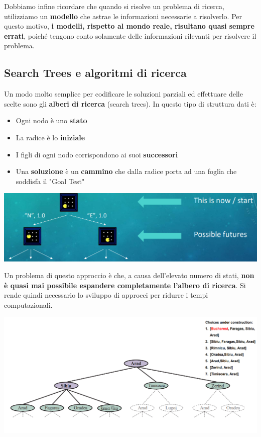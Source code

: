 \documentclass[12pt]{article}
\begin{document}
Dobbiamo infine ricordare che quando si risolve un problema di ricerca, utilizziamo un \textbf{modello} che astrae le informazioni necessarie a risolverlo.
Per questo motivo, \textbf{i modelli, rispetto al mondo reale, risultano quasi sempre errati}, poiché tengono conto solamente delle informazioni rilevanti per risolvere il problema.
\subsection{Search Trees e algoritmi di ricerca}
Un modo molto semplice per codificare le soluzioni parziali ed effettuare delle scelte sono gli \textbf{alberi di ricerca} (search trees).
In questo tipo di struttura dati è:
\begin{itemize}
    \item Ogni nodo è uno \textbf{stato}
    \item La radice è lo \textbf{iniziale}
    \item I figli di ogni nodo corrispondono ai suoi \textbf{successori}
    \item Una \textbf{soluzione} è un \textbf{cammino} che dalla radice porta ad una foglia che soddisfa il "Goal Test"
\end{itemize}
\begin{center}
    \includegraphics[width = 1\linewidth]{Images/23.PNG}
\end{center}
Un problema di questo approccio è che, a causa dell'elevato numero di stati, \textbf{non è quasi mai possibile espandere completamente l'albero di ricerca}.
Si rende quindi necessario lo sviluppo di approcci per ridurre i tempi computazionali.
\begin{center}
    \includegraphics[width = 1\linewidth]{Images/24.PNG}
\end{center}
\end{document}
